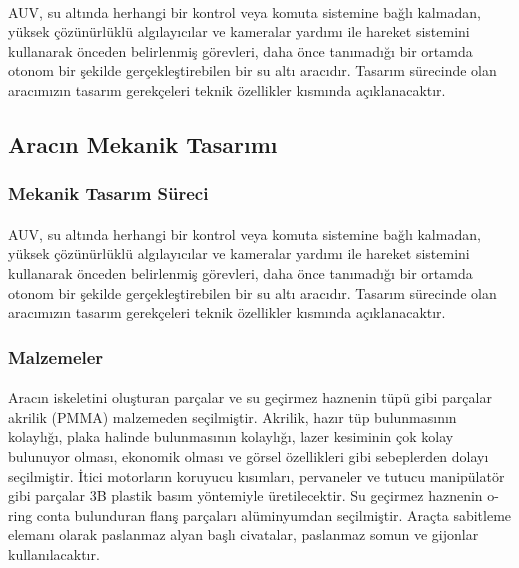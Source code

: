 \documentclass[12pt]{article}
\begin{document}
\paragraph{} AUV, su altında herhangi bir kontrol veya komuta sistemine bağlı kalmadan, yüksek çözünürlüklü algılayıcılar ve kameralar yardımı ile hareket sistemini kullanarak önceden belirlenmiş görevleri, daha önce tanımadığı bir ortamda otonom bir şekilde gerçekleştirebilen bir su altı aracıdır. Tasarım sürecinde olan aracımızın tasarım gerekçeleri teknik özellikler kısmında açıklanacaktır.
\newpage
\subsection{Aracın Mekanik Tasarımı}

\subsubsection{Mekanik Tasarım Süreci}

\paragraph{} AUV, su altında herhangi bir kontrol veya komuta sistemine bağlı kalmadan, yüksek çözünürlüklü algılayıcılar ve kameralar yardımı ile hareket sistemini kullanarak önceden belirlenmiş görevleri, daha önce tanımadığı bir ortamda otonom bir şekilde gerçekleştirebilen bir su altı aracıdır. Tasarım sürecinde olan aracımızın tasarım gerekçeleri teknik özellikler kısmında açıklanacaktır.

\subsubsection{Malzemeler}

\paragraph{} Aracın iskeletini oluşturan parçalar ve su geçirmez haznenin tüpü gibi parçalar akrilik (PMMA) malzemeden seçilmiştir. Akrilik, hazır tüp bulunmasının kolaylığı, plaka halinde bulunmasının kolaylığı, lazer kesiminin çok kolay bulunuyor olması, ekonomik olması ve görsel özellikleri gibi sebeplerden dolayı seçilmiştir. İtici motorların koruyucu kısımları, pervaneler ve tutucu manipülatör gibi parçalar 3B plastik basım yöntemiyle üretilecektir. Su geçirmez haznenin o-ring conta bulunduran flanş parçaları alüminyumdan seçilmiştir. Araçta sabitleme elemanı olarak paslanmaz alyan başlı civatalar, paslanmaz somun ve gijonlar kullanılacaktır.
\end{document}
